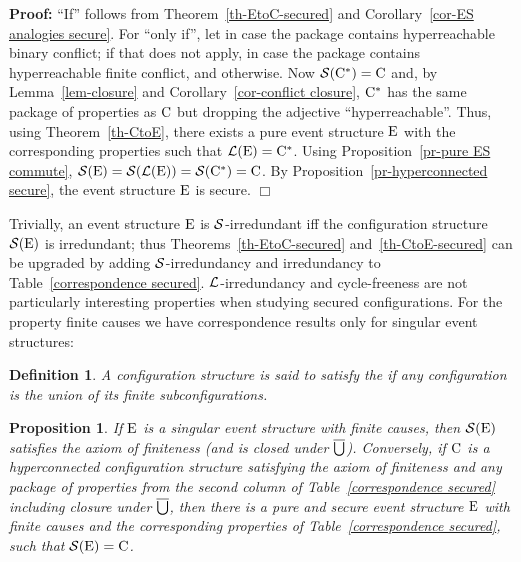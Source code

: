\documentclass[twocolumn]{article}
\newtheorem{defi}{Definition}[section]
\newtheorem{prop}{Proposition}[section]
\newenvironment{definition}[1]{\begin{defi} \rm \label{df-#1} }{\end{defi}}
\newenvironment{proposition}[1]{\begin{prop} \rm \label{pr-#1} }{\end{prop}}
\newenvironment{proof}{\begin{trivlist} \item[\hspace{\labelsep}\bf
Proof:]}{\hfill $\Box$\end{trivlist}}
\newcommand{\thm}[1]{Theorem~\ref{th-#1}}
\newcommand{\pr}[1]{Proposition~\ref{pr-#1}}
\newcommand{\lem}[1]{Lemma~\ref{lem-#1}}
\newcommand{\cor}[1]{Corollary~\ref{cor-#1}}
\newcommand{\phrase}[1]{\index{#1}{\em #1}}		\newcommand{\implies}{\Rightarrow}
\begin{document}
\begin{proof}
``If'' follows from \thm{EtoC-secured} and \cor{ES analogies secure}.
For ``only if'', let  in case the package
contains hyperreachable binary conflict; if that does not apply,
 in case the package contains hyperreachable
finite conflict, and  otherwise.  Now
${\cal S}({\rm C}^*)={\rm C}$ and, by \lem{closure} and \cor{conflict closure},
${\rm C}^*$ has the same package of properties as ${\rm C}$ but dropping the
adjective ``hyperreachable''. Thus, using \thm{CtoE}, there exists a
pure event structure ${\rm E}$ with the corresponding properties such that
${\cal L}({\rm E})={\rm C}^*$. Using \pr{pure ES commute},
${\cal S}({\rm E})={\cal S}({\cal L}({\rm E}))={\cal S}({\rm C}^*)={\rm C}$. By \pr{hyperconnected
secure}, the event structure ${\rm E}$ is secure.
\end{proof}
Trivially, an event structure ${\rm E}$ is ${\cal S}$-ir\-re\-dun\-dant iff the
configuration structure ${\cal S}({\rm E})$ is irredundant; thus
Theorems~\ref{th-EtoC-secured} and~\ref{th-CtoE-secured} can be
upgraded by adding ${\cal S}$-ir\-re\-dun\-dan\-cy and irredundancy to
Table~\ref{correspondence secured}.  ${\cal L}$-ir\-re\-dun\-dan\-cy and
cycle-freeness are not particularly interesting properties when
studying secured configurations. For the property finite causes we
have correspondence results only for singular event structures:

\begin{definition}{axiom of finiteness}
A configuration structure is said to satisfy the \phrase{axiom of
finiteness} \cite{Wi87a,Wi89} if any configuration is the union of its
finite subconfigurations.
\end{definition}

\begin{proposition}{finite causes}
If ${\rm E}$ is a singular event structure with finite causes, then
${\cal S}({\rm E})$ satisfies the axiom of finiteness (and is closed under
$\overline{\bigcup}$). Conversely, if ${\rm C}$ is a hyperconnected configuration
structure satisfying the axiom of finiteness and any package of
properties from the second column of Table~\ref{correspondence
secured} including closure under $\overline{\bigcup}$, then there is a pure and
secure event structure ${\rm E}$ with finite causes and the corresponding
properties of Table~\ref{correspondence secured}, such that ${\cal S}({\rm E}) = {\rm C}$.
\end{proposition}
\end{document}

